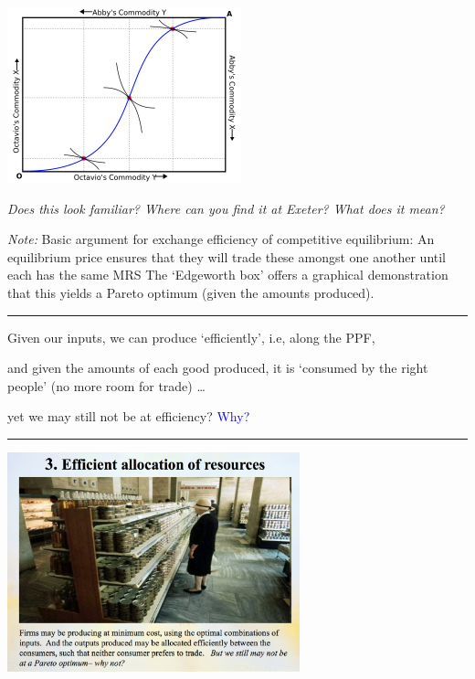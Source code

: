 \documentclass[]{article}
\begin{document}
\includegraphics[height=2in]{picsfigs/Contract-curve-on-edgeworth-box.png}

\bigskip

\emph{Does this look familiar? Where can you find it at Exeter? What
does it mean?}

\emph{Note:} Basic argument for exchange efficiency of competitive
equilibrium: An equilibrium price ensures that they will trade these
amongst one another until each has the same MRS The `Edgeworth box'
offers a graphical demonstration that this yields a Pareto optimum
(given the amounts produced).

\begin{center}\rule{0.5\linewidth}{\linethickness}\end{center}

Given our inputs, we can produce `efficiently', i.e, along the PPF,

and given the amounts of each good produced, it is `consumed by the
right people' (no more room for trade) \ldots{}

yet we may still not be at efficiency? \textcolor{blue}{Why?}

\begin{center}\rule{0.5\linewidth}{\linethickness}\end{center}

\includegraphics[height=2.5in]{picsfigs/toplevelefficiency.png}
\end{document}
